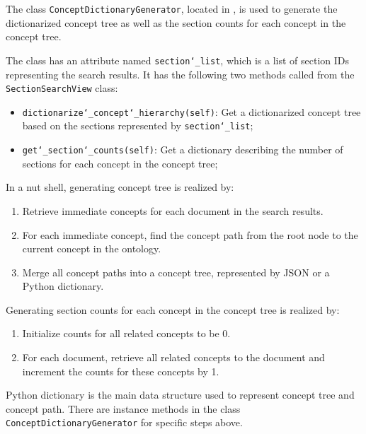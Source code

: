 The class \texttt{ConceptDictionaryGenerator}, located in , is used to generate the dictionarized concept tree as well as the section counts for each concept in the concept tree.

The class has an attribute named \texttt{section\char`_list}, which is a list of section IDs representing the search results. It has the following two methods called from the \texttt{SectionSearchView} class:
\begin{itemize}
\item \texttt{dictionarize\char`_concept\char`_hierarchy(self)}: Get a dictionarized concept tree based on the sections represented by \texttt{section\char`_list};
\item \texttt{get\char`_section\char`_counts(self)}: Get a dictionary describing the number of sections for each concept in the concept tree;
\end{itemize}

In a nut shell, generating concept tree is realized by:
\begin{enumerate}
\item Retrieve immediate concepts for each document in the search results. 
\item For each immediate concept, find the concept path from the root node to the current concept in the ontology.
\item Merge all concept paths into a concept tree, represented by JSON or a Python dictionary.
\end{enumerate}

Generating section counts for each concept in the concept tree is realized by:
\begin{enumerate}
\item Initialize counts for all related concepts to be 0.
\item For each document, retrieve all related concepts to the document and increment the counts for these concepts by 1.
\end{enumerate}

Python dictionary is the main data structure used to represent concept tree and concept path. There are instance methods in the class \texttt{ConceptDictionaryGenerator} for specific steps above.